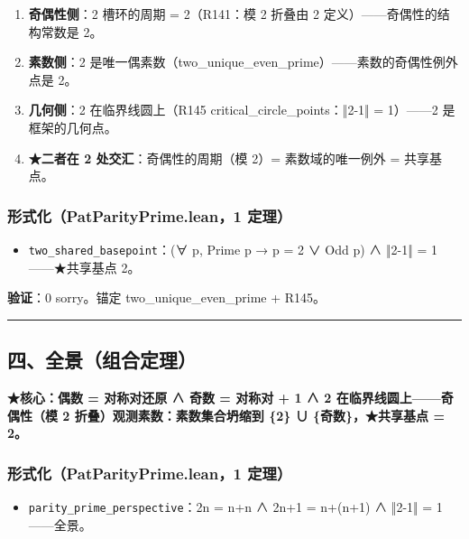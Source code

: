 \documentclass[
]{article}
\providecommand{\tightlist}{%
 \setlength{\itemsep}{0pt}\setlength{\parskip}{0pt}}
\begin{document}
\begin{enumerate}
\def\labelenumi{\arabic{enumi}.}
\tightlist
\item
 \textbf{奇偶性侧}：2 槽环的周期 = 2（R141：模 2 折叠由 2
 定义）------奇偶性的结构常数是 2。
\item
 \textbf{素数侧}：2
 是唯一偶素数（two\_unique\_even\_prime）------素数的奇偶性例外点是 2。
\item
 \textbf{几何侧}：2 在临界线圆上（R145 critical\_circle\_points：‖2-1‖
 = 1）------2 是框架的几何点。
\item
 \textbf{★二者在 2 处交汇}：奇偶性的周期（模 2）= 素数域的唯一例外 =
 共享基点。
\end{enumerate}

\subsubsection{形式化（PatParityPrime.lean，1
定理）}\label{ux5f62ux5f0fux5316patparityprime.lean1-ux5b9aux7406}

\begin{itemize}
\tightlist
\item
 \texttt{two\_shared\_basepoint}：(∀ p, Prime p → p = 2 ∨ Odd p) ∧
 ‖2-1‖ = 1------★共享基点 2。
\end{itemize}

\textbf{验证}：0 sorry。锚定 two\_unique\_even\_prime + R145。

\begin{center}\rule{0.5\linewidth}{0.5pt}\end{center}

\subsection{四、全景（组合定理）}\label{ux56dbux5168ux666fux7ec4ux5408ux5b9aux7406}

\textbf{★核心：偶数 = 对称对还原 ∧ 奇数 = 对称对 + 1 ∧ 2
在临界线圆上------奇偶性（模 2 折叠）观测素数：素数集合坍缩到 \{2\} ∪
\{奇数\}，★共享基点 = 2。}

\subsubsection{形式化（PatParityPrime.lean，1
定理）}\label{ux5f62ux5f0fux5316patparityprime.lean1-ux5b9aux7406-1}

\begin{itemize}
\tightlist
\item
 \texttt{parity\_prime\_perspective}：2n = n+n ∧ 2n+1 = n+(n+1) ∧ ‖2-1‖
 = 1------全景。
\end{itemize}
\end{document}
